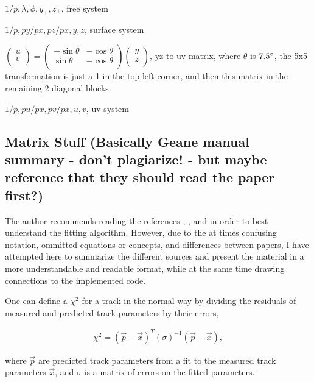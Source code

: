 \documentclass{article}
\begin{document}
$1/p, \lambda, \phi, y_{\perp}, z_{\perp}$, free system

$1/p, py/px, pz/px, y, z$, surface system

$
\begin{pmatrix}
u \\
v \\
\end{pmatrix} =
\begin{pmatrix}
-\sin{\theta} & -\cos{\theta} \\
\sin{\theta} & -\cos{\theta} \\
\end{pmatrix}
\begin{pmatrix}
y \\
z \\
\end{pmatrix}
$, yz to uv matrix, where $\theta$ is $7.5\degree$, the 5x5 transformation is just a 1 in the top left corner, and then this matrix in the remaining 2 diagonal blocks

$1/p, pu/px, pv/px, u, v$, uv system

\subsection{Matrix Stuff (Basically Geane manual summary - don't plagiarize! - but maybe reference that they should read the paper first?)}

The author recommends reading the references \cite{geanemanual}, \cite{trajfit}, and \cite{Lavezzi} in order to best understand the fitting algorithm. However, due to the at times confusing notation, ommitted equations or concepts, and differences between papers, I have attempted here to summarize the different sources and present the material in a more understandable and readable format, while at the same time drawing connections to the implemented code.

One can define a $\chi^{2}$ for a track in the normal way by dividing the residuals of measured and predicted track parameters by their errors,

\begin{align} \label{eq:chi2}
\chi^2 = (\vec{p}-\vec{x})^{T} (\sigma)^{-1} (\vec{p}-\vec{x}),
\end{align}

where $\vec{p}$ are predicted track parameters from a fit to the measured track parameters $\vec{x}$, and $\sigma$ is a matrix of errors on the fitted parameters.
\end{document}
